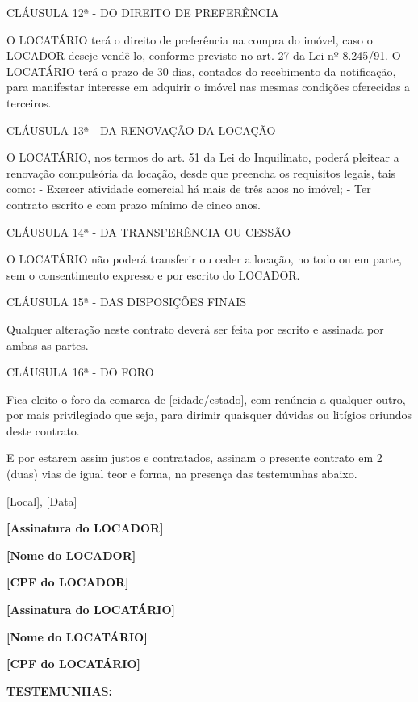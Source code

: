 \begin{anexosenv}
CLÁUSULA 12ª - DO DIREITO DE PREFERÊNCIA

O LOCATÁRIO terá o direito de preferência na compra do imóvel, caso o LOCADOR deseje vendê-lo, conforme previsto no art. 27 da Lei nº 8.245/91. O LOCATÁRIO terá o prazo de 30 dias, contados do recebimento da notificação, para manifestar interesse em adquirir o imóvel nas mesmas condições oferecidas a terceiros.

CLÁUSULA 13ª - DA RENOVAÇÃO DA LOCAÇÃO

O LOCATÁRIO, nos termos do art. 51 da Lei do Inquilinato, poderá pleitear a renovação compulsória da locação, desde que preencha os requisitos legais, tais como:
- Exercer atividade comercial há mais de três anos no imóvel;
- Ter contrato escrito e com prazo mínimo de cinco anos.

CLÁUSULA 14ª - DA TRANSFERÊNCIA OU CESSÃO

O LOCATÁRIO não poderá transferir ou ceder a locação, no todo ou em parte, sem o consentimento expresso e por escrito do LOCADOR.



CLÁUSULA 15ª - DAS DISPOSIÇÕES FINAIS

Qualquer alteração neste contrato deverá ser feita por escrito e assinada por ambas as partes.

CLÁUSULA 16ª - DO FORO

Fica eleito o foro da comarca de [cidade/estado], com renúncia a qualquer outro, por mais privilegiado que seja, para dirimir quaisquer dúvidas ou litígios oriundos deste contrato.

E por estarem assim justos e contratados, assinam o presente contrato em 2 (duas) vias de igual teor e forma, na presença das testemunhas abaixo.

\begin{center}
	[Local], [Data] \par
	\vspace{0.75cm}
	\hrulefill \par
	
	\textbf{[Assinatura do LOCADOR]} \par
	\textbf{[Nome do LOCADOR]} \par
	\textbf{[CPF do LOCADOR]} \par
	\vspace{2cm}
	
	\hrulefill \par
	
	\textbf{[Assinatura do LOCATÁRIO]} \par
	\textbf{[Nome do LOCATÁRIO]} \par
	\textbf{[CPF do LOCATÁRIO]} \par
	\vspace{0.75cm}
	\textbf{TESTEMUNHAS:} \par
	\vspace{1cm}
	

\end{center}
\end{anexosenv}
